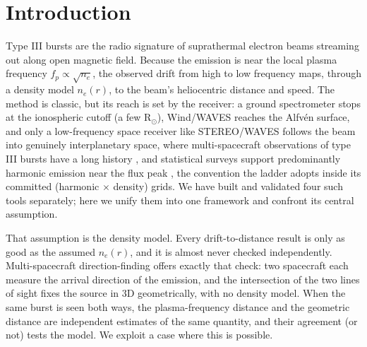\documentclass[twocolumn]{aastex631}
\begin{document}
\section{Introduction}
Type III bursts are the radio signature of suprathermal electron beams streaming out along open
magnetic field. Because the emission is near the local plasma frequency $f_p\propto\sqrt{n_e}$, the
observed drift from high to low frequency maps, through a density model $n_e(r)$, to the beam's
heliocentric distance and speed. The method is classic, but its reach is set by the receiver: a
ground spectrometer stops at the ionospheric cutoff (a few R$_\odot$), Wind/WAVES reaches the
Alfv\'en surface, and only a low-frequency space receiver like STEREO/WAVES follows the beam into
genuinely interplanetary space, where multi-spacecraft observations of type III bursts have a long
history \citep{reiner2009}, and statistical surveys support predominantly harmonic emission
near the flux peak \citep{krupar2015}, the convention the ladder adopts inside its committed
(harmonic $\times$ density) grids. We have built and validated four such tools separately; here we unify them
into one framework and confront its central assumption.

That assumption is the density model. Every drift-to-distance result is only as good as the assumed
$n_e(r)$, and it is almost never checked independently. Multi-spacecraft direction-finding
offers exactly that check: two spacecraft each measure the arrival direction of the emission, and the
intersection of the two lines of sight fixes the source in 3D geometrically, with no density
model. When the same burst is seen both ways, the plasma-frequency distance and the geometric distance
are independent estimates of the same quantity, and their agreement (or not) tests the model. We
exploit a case where this is possible.
\end{document}

